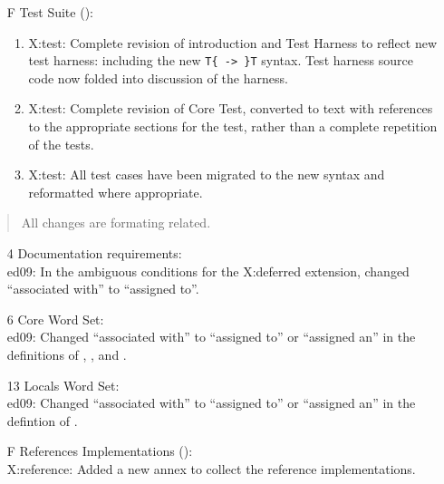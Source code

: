 \begin{itemize}
	\item[F] Test Suite ():
		\begin{enumerate}
		\item \textsf{X:test}: Complete revision of introduction and
			Test Harness to reflect new test harness: including
			the new \verb"T{ -> }T" syntax.  Test harness source
			code now folded into discussion of the harness.

		\item \textsf{X:test}: Complete revision of Core Test,
			converted to text with references to the appropriate
			sections for the test, rather than a complete repetition
			of the tests.

		\item \textsf{X:test}: All test cases have been migrated to the
			new syntax and reformatted where appropriate.
		\end{enumerate}
	\end{itemize}


	\begin{quote}
		All changes are formating related.
	\end{quote}


	\begin{itemize}
	\item[4] Documentation requirements: \\
		\textsf{ed09}: In the ambiguous conditions for the
			\textsf{X:deferred} extension, changed ``associated with''
			to \linebreak ``assigned to''.

	\item[6] Core Word Set: \\
		\textsf{ed09}:
			Changed ``associated with'' to ``assigned to''
			or ``assigned an'' in the definitions of
			, ,
			 and .

	\item[13] Locals Word Set: \\
		\textsf{ed09}:
			Changed ``associated with'' to ``assigned to''
			or ``assigned an'' in the defintion of
			.

	\item[F] References Implementations (): \\
		\textsf{X:reference}:
			Added a new annex to collect the reference implementations.
	\end{itemize}

